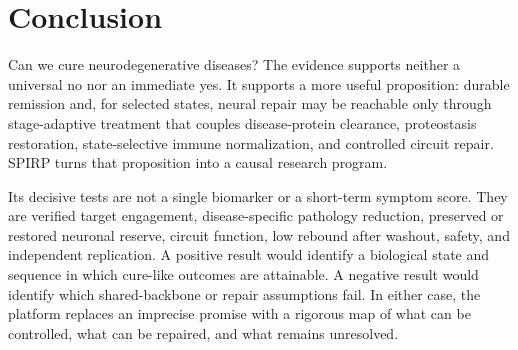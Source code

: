 \documentclass[conference]{IEEEtran}
\begin{document}
\section{Conclusion}
Can we cure neurodegenerative diseases? The evidence supports neither a universal no nor an immediate yes. It supports a more useful proposition: durable remission and, for selected states, neural repair may be reachable only through stage-adaptive treatment that couples disease-protein clearance, proteostasis restoration, state-selective immune normalization, and controlled circuit repair. SPIRP turns that proposition into a causal research program.

Its decisive tests are not a single biomarker or a short-term symptom score. They are verified target engagement, disease-specific pathology reduction, preserved or restored neuronal reserve, circuit function, low rebound after washout, safety, and independent replication. A positive result would identify a biological state and sequence in which cure-like outcomes are attainable. A negative result would identify which shared-backbone or repair assumptions fail. In either case, the platform replaces an imprecise promise with a rigorous map of what can be controlled, what can be repaired, and what remains unresolved.

\appendices
\end{document}
